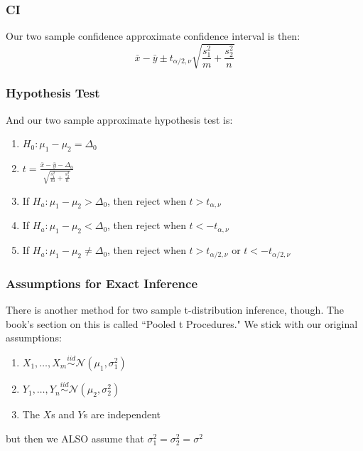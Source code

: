 \documentclass{beamer}
\begin{document}
\begin{frame}
\frametitle{CI}

Our two sample confidence approximate confidence interval is then:
\[
\bar{x} - \bar{y} \pm t_{\alpha/2, \nu} \sqrt{\frac{s_1^2}{m} + \frac{s_2^2}{n}}
\]


\end{frame}
\begin{frame}
\frametitle{Hypothesis Test}

And our two sample approximate hypothesis test is:

\begin{enumerate}
\item $H_0: \mu_1 - \mu_2 = \Delta_0$
\item $t = \frac{\bar{x} - \bar{y} - \Delta_0}{\sqrt{\frac{s_1^2}{m} + \frac{s_2^2}{n}}}$
\item If $H_a: \mu_1 - \mu_2 > \Delta_0$, then reject when $t > t_{\alpha, \nu}$
\item If $H_a: \mu_1 - \mu_2 < \Delta_0$, then reject when $t < -t_{\alpha, \nu}$
\item If $H_a: \mu_1 - \mu_2 \neq \Delta_0$, then reject when $t > t_{\alpha/2, \nu}$ or $t < -t_{\alpha/2, \nu}$
\end{enumerate}
\end{frame}
\begin{frame}
\frametitle{Assumptions for Exact Inference}

There is another method for two sample t-distribution inference, though. The book's section on this is called ``Pooled t Procedures." We stick with our original assumptions:
\begin{enumerate}
\item $X_1, \ldots, X_m \overset{iid}{\sim} \mathcal{N}(\mu_1, \sigma_1^2)$
\item $Y_1, \ldots, Y_n \overset{iid}{\sim} \mathcal{N}(\mu_2, \sigma_2^2)$
\item The $X$s and $Y$s are independent
\end{enumerate}

but then we ALSO assume that $\sigma_1^2 = \sigma_2^2 = \sigma^2$

\end{frame}
\end{document}
